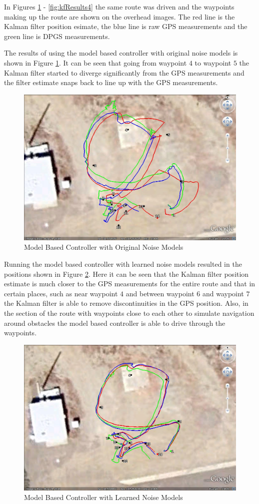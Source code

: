 In Figures \ref{fig:kfResults1} - \ref{fig:kfResults4} the same route was driven and the waypoints making up the route are shown on the overhead images. The red line is the Kalman filter position esimate, the blue line is raw GPS measurements and the green line is DPGS measurements.

The results of using the model based controller with original noise models is shown in Figure \ref{fig:kfResults1}. It can be seen that going from waypoint $4$ to waypoint $5$ the Kalman filter started to diverge significantly from the GPS measurements and the filter estimate snaps back to line up with the GPS measurements.

\begin{figure}[ht!]
	\centering
	\includegraphics[width=.75\textwidth]{images/GE/20101203_1551_kf_lyapOrigQR}
	\caption{Model Based Controller with Original Noise Models}
	\label{fig:kfResults1}
\end{figure}

Running the model based controller with learned noise models resulted in the positions shown in Figure \ref{fig:kfResults2}. Here it can be seen that the Kalman filter position estimate is much closer to the GPS measurements for the entire route and that in certain places, such as near waypoint $4$ and between waypoint $6$ and waypoint $7$ the Kalman filter is able to remove discontinuities in the GPS position. Also, in the section of the route with waypoints close to each other to simulate navigation around obstacles the model based controller is able to drive through the waypoints.

\begin{figure}[ht!]
	\centering
	\includegraphics[width=.75\textwidth]{images/GE/20101203_1545_kf_lyapNewQR}
	\caption{Model Based Controller with Learned Noise Models}
	\label{fig:kfResults2}
\end{figure}

